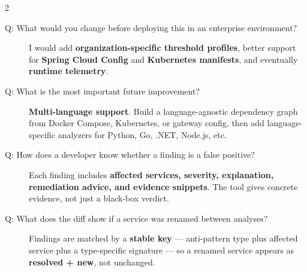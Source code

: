 \documentclass[10pt,a4paper]{article}
\begin{document}
\begin{multicols}{2}
\begin{description}
    \item[Q: What would you change before deploying this in an enterprise environment?]
    I would add \textbf{organization-specific threshold profiles}, better support for \textbf{Spring Cloud Config} and \textbf{Kubernetes manifests}, and eventually \textbf{runtime telemetry}.

    \item[Q: What is the most important future improvement?]
    \textbf{Multi-language support}. Build a language-agnostic dependency graph from Docker Compose, Kubernetes, or gateway config, then add language-specific analyzers for Python, Go, .NET, Node.js, etc.

    \item[Q: How does a developer know whether a finding is a false positive?]
    Each finding includes \textbf{affected services, severity, explanation, remediation advice, and evidence snippets}. The tool gives concrete evidence, not just a black-box verdict.



    \item[Q: What does the diff show if a service was renamed between analyses?]
    Findings are matched by a \textbf{stable key} --- anti-pattern type plus affected service plus a type-specific signature --- so a renamed service appears as \textbf{resolved + new}, not unchanged.



\end{description}
\end{multicols}
\end{document}
